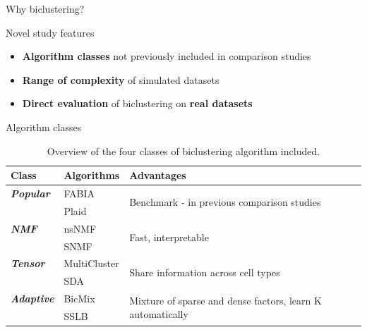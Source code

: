 \documentclass[final]{beamer}
\newlength{\onecolwid}
\begin{document}
\begin{frame}[t]
\begin{columns}[t]
\begin{column}{\onecolwid}
\begin{block}{Why biclustering?}
\end{block}






\begin{block}{Novel study features}

\begin{itemize}
    \item \textbf{Algorithm classes} not previously included in comparison studies
    \item \textbf{Range of complexity} of simulated datasets
    \item \textbf{Direct evaluation} of biclustering on \textbf{real datasets}
\end{itemize}

\end{block}





\begin{block}{Algorithm classes}

\begin{table}[t!]
    \caption{Overview of the four classes of biclustering algorithm included.}

    \begin{tabular}{ l | l | l }
\textbf{Class} & \textbf{Algorithms} & \textbf{Advantages} \\ \hline
    \textbf{\textit{Popular}} & FABIA & \multirow{2}{0.55 \textwidth}{Benchmark - in previous comparison studies} \\
     & Plaid & \\ \hline
    \textbf{\textit{NMF}} & nsNMF & \multirow{2}{0.55 \textwidth}{Fast, interpretable} \\
     & SNMF & \\ \hline
    \textbf{\textit{Tensor}} & MultiCluster & \multirow{2}{0.55 \textwidth}{Share information across cell types} \\
     & SDA & \\ \hline
    \textbf{\textit{Adaptive}} & BicMix & \multirow{2}{0.55 \textwidth}{Mixture of sparse and dense factors, learn K automatically} \\
     & SSLB & \\ \hline
\end{tabular}
\end{table}


\end{block}
\end{column}
\end{columns}
\end{frame}
\end{document}
